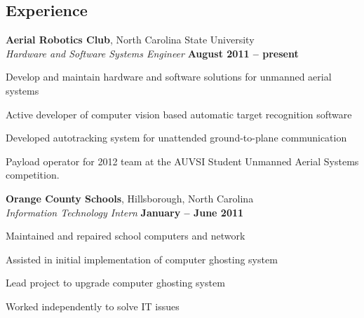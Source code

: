 \documentclass[margin,line,letterpaper]{resume}
\begin{document}
\begin{resume}
    \section{\mysidestyle Experience}

    \textbf{Aerial Robotics Club}, North Carolina State University \vspace{2mm}\\\vspace{1mm}%
    \textsl{Hardware and Software Systems Engineer} \hfill \textbf{August 2011 -- present}\vspace{-3mm}\\\vspace{-1mm}%
    \begin{list2}
    \item Develop and maintain hardware and software solutions for unmanned aerial systems
    \item Active developer of computer vision based automatic target recognition software
    \item Developed autotracking system for unattended ground-to-plane communication
    \item Payload operator for 2012 team at the AUVSI Student Unmanned Aerial Systems competition.
    \end{list2}\vspace{-1.5mm}

    \textbf{Orange County Schools}, Hillsborough, North Carolina \vspace{2mm}\\\vspace{1mm}%
    \textsl{Information Technology Intern} \hfill \textbf{January -- June 2011}\vspace{-3mm}\\\vspace{-1mm}%
    \begin{list2}
    \item Maintained and repaired school computers and network
    \item Assisted in initial implementation of computer ghosting system 
    \item Lead project to upgrade computer ghosting system
    \item Worked independently to solve IT issues
    \end{list2}\vspace{-1.5mm}



\end{resume}
\end{document}
